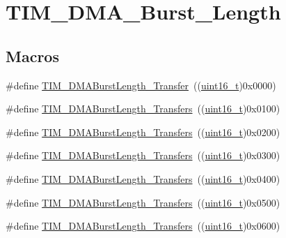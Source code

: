 \hypertarget{group___t_i_m___d_m_a___burst___length}{}\section{T\+I\+M\+\_\+\+D\+M\+A\+\_\+\+Burst\+\_\+\+Length}
\label{group___t_i_m___d_m_a___burst___length}
\subsection*{Macros}
\begin{DoxyCompactItemize}
\item 
\#define \hyperlink{group___t_i_m___d_m_a___burst___length_gab87f91f1c5583b9888cb6bb37fc639e2}{T\+I\+M\+\_\+\+D\+M\+A\+Burst\+Length\+\_\+Transfer}~((\hyperlink{_p_e___types_8h_a1f1825b69244eb3ad2c7165ddc99c956}{uint16\+\_\+t})0x0000)
\item 
\#define \hyperlink{group___t_i_m___d_m_a___burst___length_ga829504c3e8c90a9445f6a223bc3034f8}{T\+I\+M\+\_\+\+D\+M\+A\+Burst\+Length\+\_\+Transfers}~((\hyperlink{_p_e___types_8h_a1f1825b69244eb3ad2c7165ddc99c956}{uint16\+\_\+t})0x0100)
\item 
\#define \hyperlink{group___t_i_m___d_m_a___burst___length_ga3a99863a0925e0cc9a11b91aade66f11}{T\+I\+M\+\_\+\+D\+M\+A\+Burst\+Length\+\_\+Transfers}~((\hyperlink{_p_e___types_8h_a1f1825b69244eb3ad2c7165ddc99c956}{uint16\+\_\+t})0x0200)
\item 
\#define \hyperlink{group___t_i_m___d_m_a___burst___length_ga84bfeb309593a1ac580e233bf7514b36}{T\+I\+M\+\_\+\+D\+M\+A\+Burst\+Length\+\_\+Transfers}~((\hyperlink{_p_e___types_8h_a1f1825b69244eb3ad2c7165ddc99c956}{uint16\+\_\+t})0x0300)
\item 
\#define \hyperlink{group___t_i_m___d_m_a___burst___length_ga44f8aa51fbe8887a5f3c37a0e776902c}{T\+I\+M\+\_\+\+D\+M\+A\+Burst\+Length\+\_\+Transfers}~((\hyperlink{_p_e___types_8h_a1f1825b69244eb3ad2c7165ddc99c956}{uint16\+\_\+t})0x0400)
\item 
\#define \hyperlink{group___t_i_m___d_m_a___burst___length_ga8be40a21654eea72e9c1bf9922675b22}{T\+I\+M\+\_\+\+D\+M\+A\+Burst\+Length\+\_\+Transfers}~((\hyperlink{_p_e___types_8h_a1f1825b69244eb3ad2c7165ddc99c956}{uint16\+\_\+t})0x0500)
\item 
\#define \hyperlink{group___t_i_m___d_m_a___burst___length_gaf2ae83bd73b0e92b73e5ebfc11f9bfad}{T\+I\+M\+\_\+\+D\+M\+A\+Burst\+Length\+\_\+Transfers}~((\hyperlink{_p_e___types_8h_a1f1825b69244eb3ad2c7165ddc99c956}{uint16\+\_\+t})0x0600)

\end{DoxyCompactItemize}
